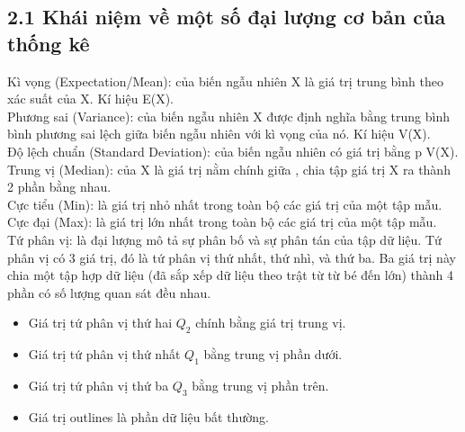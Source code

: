 \documentclass[a4paper]{article}
\newcommand{\gachdau}{\hspace*{1.5em}\ignorespaces}
\begin{document}
        \subsection*{2.1 Khái niệm về một số đại lượng cơ bản của thống kê}
            \fontsize{13pt}{12pt}\selectfont
            \gachdau
            Kì vọng (Expectation/Mean): của biến ngẫu nhiên X là giá trị trung bình theo xác suất của X. Kí hiệu E(X).\\
            \gachdau
            Phương sai (Variance): của biến ngẫu nhiên X được định nghĩa bằng trung bình bình phương sai lệch giữa biến ngẫu nhiên với kì vọng của nó. Kí hiệu V(X).\\
            \gachdau
            Độ lệch chuẩn (Standard Deviation): của biến ngẫu nhiên có giá trị bằng p V(X).\\
            \gachdau
            Trung vị (Median): của X là giá trị nằm chính giữa , chia tập giá trị X ra thành 2 phần bằng nhau.\\
            \gachdau
            Cực tiểu (Min): là giá trị nhỏ nhất trong toàn bộ các giá trị của một tập mẫu.\\
            \gachdau
            Cực đại (Max): là giá trị lớn nhất trong toàn bộ các giá trị của một tập mẫu.\\
            \gachdau
            Tứ phân vị: là đại lượng mô tả sự phân bố và sự phân tán của tập dữ liệu. Tứ phân vị có 3 giá trị, đó là tứ phân vị thứ nhất, thứ nhì, và thứ ba. Ba giá trị này chia một tập hợp dữ liệu (đã sắp xếp dữ liệu theo trật từ từ bé đến lớn) thành 4 phần có số lượng quan sát đều nhau.
            \begin{itemize}[leftmargin=3em, itemsep=-1.5em, parsep=1.6em]
                \vspace{-6pt}
                \item \fontsize{13pt}{15pt}\selectfont Giá trị tứ phân vị thứ hai $Q_2$ chính bằng giá trị trung vị.
                \item \fontsize{13pt}{15pt}\selectfont Giá trị tứ phân vị thứ nhất $Q_1$ bằng trung vị phần dưới.
                \item \fontsize{13pt}{15pt}\selectfont Giá trị tứ phân vị thứ ba $Q_3$ bằng trung vị phần trên.
                \item \fontsize{13pt}{15pt}\selectfont Giá trị outlines là phần dữ liệu bất thường.
            \end{itemize}
\end{document}

